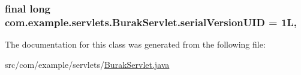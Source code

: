 \subsubsection[{serial\+Version\+U\+I\+D}]{\setlength{\rightskip}{0pt plus 5cm}final long com.\+example.\+servlets.\+Burak\+Servlet.\+serial\+Version\+U\+I\+D = 1\+L\hspace{0.3cm}{\ttfamily [static]}, {\ttfamily [private]}}\label{classcom_1_1example_1_1servlets_1_1_burak_servlet_a03b3133becc008e75537df6820aaef5c}


The documentation for this class was generated from the following file\+:\begin{DoxyCompactItemize}
\item 
src/com/example/servlets/\hyperlink{_burak_servlet_8java}{Burak\+Servlet.\+java}\end{DoxyCompactItemize}
